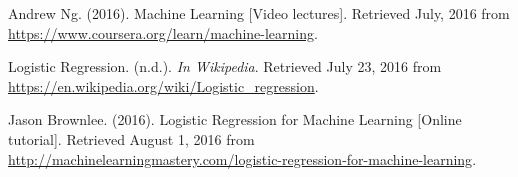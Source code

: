 
\newpage
{}
{}
\begin{thebibliography}{9}

  Andrew Ng. (2016). Machine Learning [Video lectures].
  Retrieved July, 2016 from \url{https://www.coursera.org/learn/machine-learning}.

  Logistic Regression. (n.d.). {\em In Wikipedia}. Retrieved July 23, 2016 from
  \url{https://en.wikipedia.org/wiki/Logistic_regression}.

  Jason Brownlee. (2016). Logistic Regression for Machine Learning [Online tutorial].
  Retrieved August 1, 2016 from
  \url{http://machinelearningmastery.com/logistic-regression-for-machine-learning}.

\end{thebibliography}
